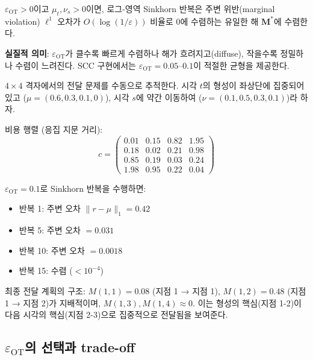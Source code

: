 \begin{theorem}[Sinkhorn 수렴]
\label{thm:sinkhorn-convergence}
$\varepsilon_{\mathrm{OT}} > 0$이고 $\mu_t, \nu_s > 0$이면, 로그-영역 Sinkhorn 반복은 주변 위반(marginal violation) $\ell^1$ 오차가 $O(\log(1/\varepsilon))$ 비율로 0에 수렴하는 유일한 해 $\mathbf{M}^*$에 수렴한다.
\end{theorem}

\textbf{실질적 의미}: $\varepsilon_{\mathrm{OT}}$가 클수록 빠르게 수렴하나 해가 흐려지고(diffuse), 작을수록 정밀하나 수렴이 느려진다. SCC 구현에서는 $\varepsilon_{\mathrm{OT}} = 0.05$--$0.1$이 적절한 균형을 제공한다.

\begin{example}
\label{ex:small-sinkhorn}
$4 \times 4$ 격자에서의 전달 문제를 수동으로 추적한다. 시각 $t$의 형성이 좌상단에 집중되어 있고 ($\mu = (0.6, 0.3, 0.1, 0)$), 시각 $s$에 약간 이동하여 ($\nu = (0.1, 0.5, 0.3, 0.1)$)라 하자.

비용 행렬 (응집 지문 거리):
\begin{equation}
    c = \begin{pmatrix}
        0.01 & 0.15 & 0.82 & 1.95 \\
        0.18 & 0.02 & 0.21 & 0.98 \\
        0.85 & 0.19 & 0.03 & 0.24 \\
        1.98 & 0.95 & 0.22 & 0.04
    \end{pmatrix} \nonumber
\end{equation}

$\varepsilon_{\mathrm{OT}} = 0.1$로 Sinkhorn 반복을 수행하면:
\begin{itemize}
    \item 반복 1: 주변 오차 $\|r - \mu\|_1 = 0.42$
    \item 반복 5: 주변 오차 $= 0.031$
    \item 반복 10: 주변 오차 $= 0.0018$
    \item 반복 15: 수렴 ($< 10^{-4}$)
\end{itemize}

최종 전달 계획의 구조: $M(1,1) = 0.08$ (지점 1 → 지점 1), $M(1,2) = 0.48$ (지점 1 → 지점 2)가 지배적이며, $M(1,3), M(1,4) \approx 0$. 이는 형성의 핵심(지점 1-2)이 다음 시각의 핵심(지점 2-3)으로 집중적으로 전달됨을 보여준다.
\end{example}

\subsection{$\varepsilon_{\mathrm{OT}}$의 선택과 trade-off}

